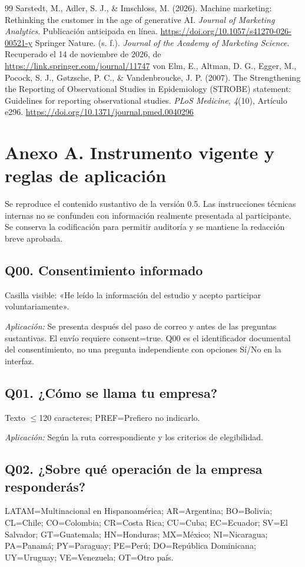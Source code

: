 \documentclass[12pt,letterpaper]{article}
\begin{document}
\begin{thebibliography}{99}
 Sarstedt, M., Adler, S. J., \& Imschloss, M. (2026). Machine marketing: Rethinking the customer in the age of generative AI. \emph{Journal of Marketing Analytics}. Publicación anticipada en línea. \url{https://doi.org/10.1057/s41270-026-00521-y}
 Springer Nature. (s. f.). \emph{Journal of the Academy of Marketing Science}. Recuperado el 14 de noviembre de 2026, de \url{https://link.springer.com/journal/11747}
 von Elm, E., Altman, D. G., Egger, M., Pocock, S. J., Gøtzsche, P. C., \& Vandenbroucke, J. P. (2007). The Strengthening the Reporting of Observational Studies in Epidemiology (STROBE) statement: Guidelines for reporting observational studies. \emph{PLoS Medicine, 4}(10), Artículo e296. \url{https://doi.org/10.1371/journal.pmed.0040296}
\end{thebibliography}\endgroup
\clearpage
\section*{Anexo A. Instrumento vigente y reglas de aplicación}
Se reproduce el contenido sustantivo de la versión 0.5. Las instrucciones técnicas internas no se confunden con información realmente presentada al participante. Se conserva la codificación para permitir auditoría y se mantiene la redacción breve aprobada.

\subsection*{Q00. Consentimiento informado}
Casilla visible: «He leído la información del estudio y acepto participar voluntariamente».

\emph{Aplicación:} Se presenta después del paso de correo y antes de las preguntas sustantivas. El envío requiere consent=true. Q00 es el identificador documental del consentimiento, no una pregunta independiente con opciones Sí/No en la interfaz.

\subsection*{Q01. ¿Cómo se llama tu empresa?}
Texto $\leq$120 caracteres; PREF=Prefiero no indicarlo.

\emph{Aplicación:} Según la ruta correspondiente y los criterios de elegibilidad.

\subsection*{Q02. ¿Sobre qué operación de la empresa responderás?}
LATAM=Multinacional en Hispanoamérica; AR=Argentina; BO=Bolivia; CL=Chile; CO=Colombia; CR=Costa Rica; CU=Cuba; EC=Ecuador; SV=El Salvador; GT=Guatemala; HN=Honduras; MX=México; NI=Nicaragua; PA=Panamá; PY=Paraguay; PE=Perú; DO=República Dominicana; UY=Uruguay; VE=Venezuela; OT=Otro país.
\end{document}
